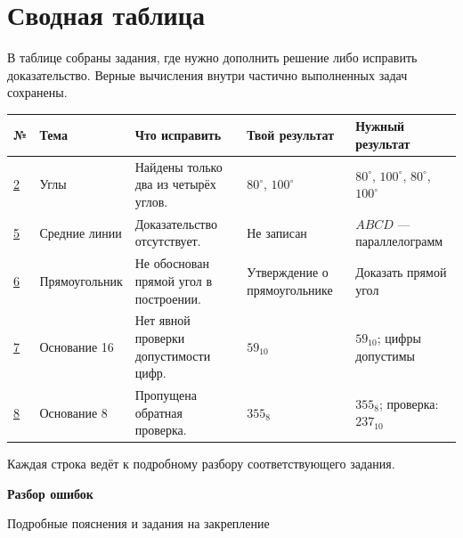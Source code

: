 \documentclass[a4paper,11pt]{article}
\begin{document}
\section*{Сводная таблица}
В таблице собраны задания, где нужно дополнить решение либо исправить доказательство. Верные вычисления внутри частично выполненных задач сохранены.
\par\vspace{5mm}
{\small
\setlength{\tabcolsep}{3pt}
\renewcommand{\arraystretch}{1.38}
\begin{tabularx}{\linewidth}{@{}p{12mm}p{26mm}X p{28mm}p{31mm}@{}}
\toprule
\textbf{№}&\textbf{Тема}&\textbf{Что исправить}&\textbf{Твой результат}&\textbf{Нужный результат}\\
\midrule
\hyperref[task:2]{2}&Углы&Найдены только два из четырёх углов.&$80^\circ$, $100^\circ$&$80^\circ$, $100^\circ$, $80^\circ$, $100^\circ$\\
\addlinespace[3pt]
\hyperref[task:5]{5}&Средние линии&Доказательство отсутствует.&Не записан&$ABCD$ — параллелограмм\\
\addlinespace[3pt]
\hyperref[task:6]{6}&Прямо\-угольник&Не обоснован прямой угол в построении.&Утверждение о прямоугольнике&Доказать прямой угол\\
\addlinespace[3pt]
\hyperref[task:7]{7}&Основание 16&Нет явной проверки допустимости цифр.&$59_{10}$&$59_{10}$; цифры допустимы\\
\addlinespace[3pt]
\hyperref[task:8]{8}&Основание 8&Пропущена обратная проверка.&$355_8$&$355_8$; проверка: $237_{10}$\\
\bottomrule
\end{tabularx}}
\vspace{9mm}
\textcolor{muted}{\small Каждая строка ведёт к подробному разбору соответствующего задания.}
\clearpage
\thispagestyle{empty}
\vspace*{\fill}
\begin{center}
{\Huge\bfseries\color{navy} Разбор ошибок}\par\vspace{5mm}
{\large\color{muted} Подробные пояснения и задания на закрепление}
\end{center}
\vspace*{\fill}
\end{document}
